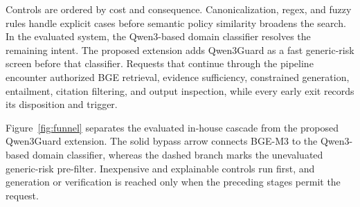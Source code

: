 \documentclass[conference,a4paper]{IEEEtran}
\begin{document}
Controls are ordered by cost and consequence. Canonicalization, regex, and fuzzy rules handle explicit cases before semantic policy similarity broadens the search. In the evaluated system, the Qwen3-based domain classifier resolves the remaining intent. The proposed extension adds Qwen3Guard as a fast generic-risk screen before that classifier. Requests that continue through the pipeline encounter authorized BGE retrieval, evidence sufficiency, constrained generation, entailment, citation filtering, and output inspection, while every early exit records its disposition and trigger.

Figure~\ref{fig:funnel} separates the evaluated in-house cascade from the proposed Qwen3Guard extension. The solid bypass arrow connects BGE-M3 to the Qwen3-based domain classifier, whereas the dashed branch marks the unevaluated generic-risk pre-filter. Inexpensive and explainable controls run first, and generation or verification is reached only when the preceding stages permit the request.
\end{document}
